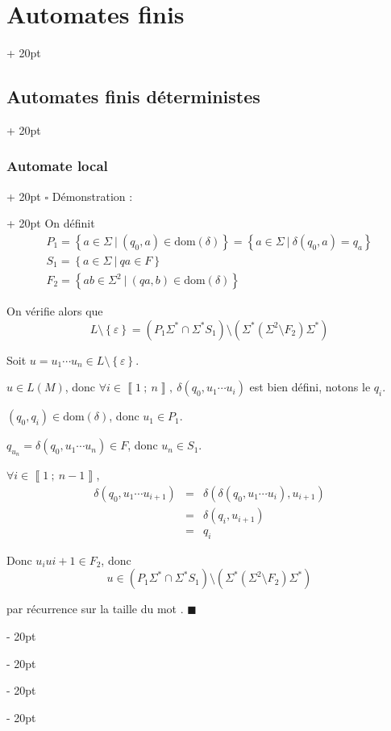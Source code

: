 \documentclass[a4paper, 12pt, twoside]{article}
\newcommand{\nset}[2]{\left\llbracket #1\ ;\ #2 \right\rrbracket}
\newcommand{\lr}[1]{\left( #1 \right)}
\newcommand{\set}[1]{\left\{ #1 \right\}}
\newcommand{\ind}[1][20pt]{\advance\leftskip + #1}
\newcommand{\deind}[1][20pt]{\advance\leftskip - #1}
\newenvironment{indt}[2][20pt]{#2 \par \ind[#1]}{\par \deind} %
\newenvironment{proof}[1][{Démonstration :}]{\begin{indt}{$\square$ #1}}{$\blacksquare$ \end{indt}}
\begin{document}
\begin{indt}{\section{Automates finis}}
\begin{indt}{\subsection{Automates finis déterministes}}
\begin{indt}{\subsubsection{Automate local}}
\begin{proof}
                On définit
                \[
                    \begin{array}{l}
                        P_1 = \set{a \in \Sigma\ |\ (q_0, a) \in \mathrm{dom}(\delta)}
                        = \set{a \in \Sigma\ |\ \delta(q_0, a) = q_a}
                        \\
                        S_1 = \set{a \in \Sigma\ |\ qa \in F}
                        \\
                        F_2 = \set{ab \in \Sigma^2\ |\ (qa, b) \in \mathrm{dom}(\delta)}
                    \end{array}
                \]

                On vérifie alors que
                \[
                    L \setminus \set \varepsilon
                    = (P_1 \Sigma^* \cap \Sigma^* S_1) \setminus \lr{\Sigma^* \lr{\Sigma^2 \setminus F_2} \Sigma^*}
                \]

                \boxed{\subseteq} Soit $u = u_1 \cdots u_n \in L \setminus \set \varepsilon$.

                $u \in L(M)$, donc $\forall i \in \nset 1 n,\ \delta(q_0, u_1 \cdots u_i)$ est bien défini, notons le $q_i$.

                $(q_0, q_i) \in \mathrm{dom}(\delta)$, donc $u_1 \in P_1$.

                $q_{u_n} = \delta(q_0, u_1 \cdots u_n) \in F$, donc $u_n \in S_1$.

                $\forall i \in \nset 1 {n - 1}$,
                \[
                    \begin{array}{rcl}
                        \delta(q_0, u_1 \cdots u_{i + 1})
                        &=& \delta(\delta(q_0, u_1 \cdots u_i), u_{i + 1})
                        \\
                        &=& \delta(q_i, u_{i + 1})
                        \\
                        &=& q_i
                    \end{array}
                \]

                Donc $u_i u{i + 1} \in F_2$, donc
                \[
                    u \in (P_1 \Sigma^* \cap \Sigma^* S_1) \setminus \lr{\Sigma^* \lr{\Sigma^2 \setminus F_2} \Sigma^*}
                \]

                \vspace{6pt}
                
                \boxed{\supseteq} par récurrence sur la taille du mot .
                \end{proof}
            \end{indt}
        \end{indt}


\end{indt}
\end{document}
